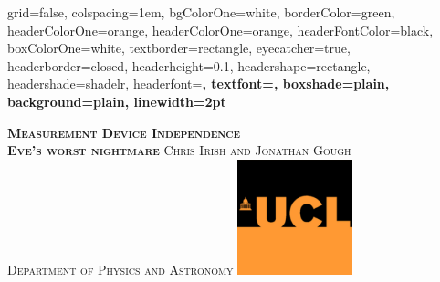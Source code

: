 \documentclass[portrait,final,archA0,fontscale=0.372]{baposter}
\begin{document}

\begin{poster}%
  {
  grid=false,
  colspacing=1em,
  bgColorOne=white,
  borderColor=green,
  headerColorOne=orange,
  headerColorOne=orange,
  headerFontColor=black,
  boxColorOne=white,
  textborder=rectangle,
  eyecatcher=true,
  headerborder=closed,
  headerheight=0.1\textheight,
  headershape=rectangle,
  headershade=shadelr,
  headerfont=\Large\bf\textsc, %
  textfont={\setlength{\parindent}{1.5em}},
  boxshade=plain,
  background=plain,
  linewidth=2pt
  }
  {\begin{minipage}{8em}
   \hfill\vspace{1in}
  \end{minipage} } %
  {\bf \textsc{  Measurement Device Independence \\ Eve's worst nightmare  } }
  {\textsc{  Chris Irish and Jonathan Gough \\ Department of Physics and Astronomy}}
  {%
    \includegraphics[height=9.0em]{img/ucl_logo}
  }

    \newcommand{\colouredcircle}{%
      \tikz{\useasboundingbox (-0.2em,-0.32em) rectangle(0.2em,0.32em); \draw[draw=black,fill=lightblue,line width=0.03em] (0,0) circle(0.18em);}}


\end{poster}
\end{document}
